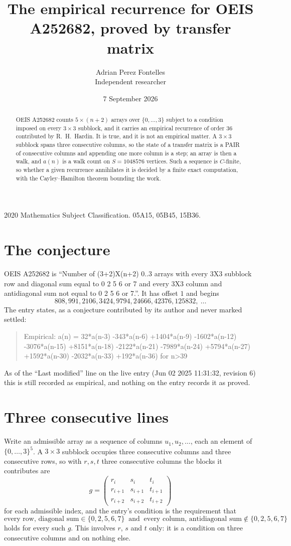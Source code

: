 \documentclass[11pt,a4paper]{article}
\title{The empirical recurrence for OEIS A252682, proved by transfer matrix}
\author{Adrian Perez Fontelles\\ \small Independent researcher}
\date{7 September 2026}
\theoremstyle{plain}
\theoremstyle{definition}
\begin{document}
\maketitle

\begin{abstract}
OEIS A252682 counts $5\times(n+2)$ arrays over $\{0,\dots,3\}$ subject to a condition imposed on
every $3\times3$ subblock, and it carries an empirical recurrence of order $36$
contributed by R.~H.~Hardin. It is true, and it is not an empirical matter. A $3\times3$
subblock spans three consecutive columns, so the state of a transfer matrix is a PAIR of
consecutive columns and appending one more column is a step; an array is then a walk, and
$a(n)$ is a walk count on $S=1048576$ vertices. Such a sequence is $C$-finite, so whether a given
recurrence annihilates it is decided by a finite exact computation, with the Cayley--Hamilton
theorem bounding the work.
\end{abstract}

\noindent\small 2020 Mathematics Subject Classification. 05A15, 05B45, 15B36.\normalsize

\section{The conjecture}

OEIS A252682 is ``Number of (3+2)X(n+2) 0..3 arrays with every 3X3 subblock row and diagonal sum equal to 0 2 5 6 or 7 and every 3X3 column and antidiagonal sum not equal to 0 2 5 6 or 7.''. It has offset $1$ and begins
\[
808, 991, 2106, 3424, 9794, 24666, 42376, 125832,\ \dots
\]
The entry states, as a conjecture contributed by its author and never marked settled:
\begin{quote}
Empirical: a(n) = 32*a(n-3) -343*a(n-6) +1404*a(n-9) -1602*a(n-12) -3076*a(n-15) +8151*a(n-18) -2122*a(n-21) -7989*a(n-24) +5794*a(n-27) +1592*a(n-30) -2032*a(n-33) +192*a(n-36) for n>39
\end{quote}
As of the ``Last modified'' line on the live entry (Jun 02 2025 11:31:32, revision 6) this is still
recorded as empirical, and nothing on the entry records it as proved.

\section{Three consecutive lines}

Write an admissible array as a sequence of columns $u_1,u_2,\dots$, each an element of
$\{0,\dots,3\}^{5}$. A $3\times3$ subblock occupies three consecutive columns and
three consecutive rows, so with $r,s,t$ three consecutive columns the blocks it
contributes are
\[
g=\begin{pmatrix}r_i&s_i&t_i\\ r_{i+1}&s_{i+1}&t_{i+1}\\ r_{i+2}&s_{i+2}&t_{i+2}\end{pmatrix}
\]
for each admissible index, and the entry's condition is the requirement that
\[
\text{every row, diagonal sum} \in \{0,2,5,6,7\}\ \text{ and }\ \text{every column, antidiagonal sum} \notin \{0,2,5,6,7\}
\]
holds for every such $g$. This involves $r$, $s$ and $t$ only: it is a condition on
three consecutive columns and on nothing else.
\end{document}
